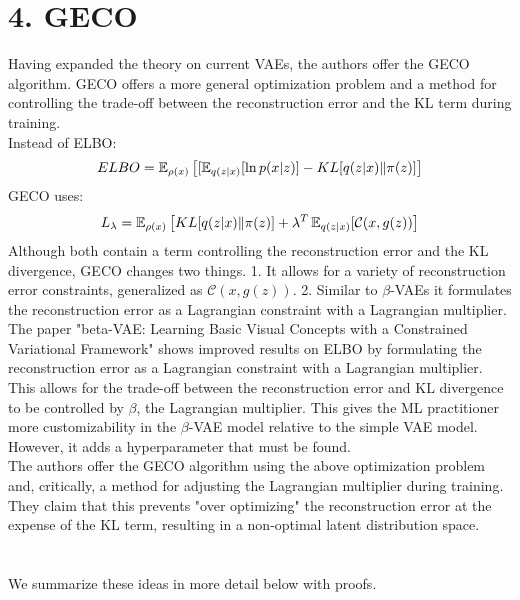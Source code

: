 \section*{4. GECO}
Having expanded the theory on current VAEs, the authors offer the GECO algorithm. GECO offers a more general optimization problem and a method for controlling the trade-off between the reconstruction error and the KL term during training.\\
Instead of ELBO:
\begin{gather*}
{ELBO} =  \operatorname{\mathbb{E}}_{\rho(x)}\left[[\operatorname{\mathbb{E}}_{q(z|x)}[\ln{p(x|z)}] - KL[q(z|x) \| \pi(z)]\right]
\end{gather*}
GECO uses:
\begin{gather*}
L_{\lambda} = \operatorname{\mathbb{E}}_{\rho(x)}\left[KL[q(z|x) \| \pi(z)] + \lambda^{T}\operatorname{\mathbb{E}}_{q(z|x)}[\mathcal{C}(x, g(z))\right]
\end{gather*}
Although both contain a term controlling the reconstruction error and the KL divergence, GECO changes two things. 1. It allows for a variety of reconstruction error constraints, generalized as $\mathcal{C}(x, g(z))$. 2. Similar to $\beta$-VAEs it formulates the reconstruction error as a Lagrangian constraint with a Lagrangian multiplier.\\
The paper "beta-VAE: Learning Basic Visual Concepts with a Constrained Variational Framework" shows improved results on ELBO by formulating the reconstruction error as a Lagrangian constraint with a Lagrangian multiplier. This allows for the trade-off between the reconstruction error and KL divergence to be controlled by $\beta$, the Lagrangian multiplier. This gives the ML practitioner more customizability in the $\beta$-VAE model relative to the simple VAE model. However, it adds a hyperparameter that must be found.\\
The authors offer the GECO algorithm using the above optimization problem and, critically, a method for adjusting the Lagrangian multiplier during training. They claim that this prevents "over optimizing" the reconstruction error at the expense of the KL term, resulting in a non-optimal latent distribution space.

\section*{}
We summarize these ideas in more detail below with proofs.
